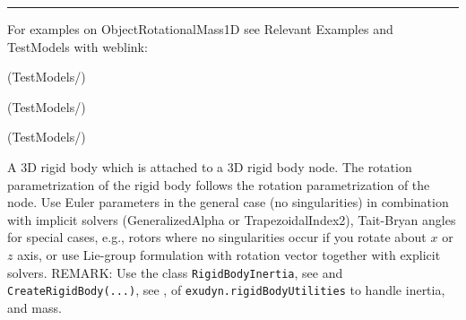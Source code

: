 \vspace{6pt}\par\noindent\rule{\textwidth}{0.4pt}
%
\noindent For examples on ObjectRotationalMass1D see Relevant Examples and TestModels with weblink:
\bi
\item {} (TestModels/)
\item {} (TestModels/)
\item {} (TestModels/)

\ei

%
\newpage


\label{sec:item:ObjectRigidBody}
A 3D rigid body which is attached to a 3D rigid body node. The rotation parametrization of the rigid body follows the rotation parametrization of the node. Use Euler parameters in the general case (no singularities) in combination with implicit solvers (GeneralizedAlpha or TrapezoidalIndex2), Tait-Bryan angles for special cases, e.g., rotors where no singularities occur if you rotate about $x$ or $z$ axis, or use Lie-group formulation with rotation vector together with explicit solvers. REMARK: Use the class \texttt{RigidBodyInertia}, see  and \texttt{CreateRigidBody(...)}, see , of \texttt{exudyn.rigidBodyUtilities} to handle inertia,  and mass. 
\vspace{12pt}\\

